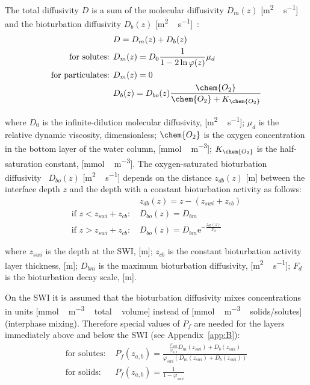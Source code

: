 \documentclass[gmd, manuscript]{copernicus}
\begin{document}
The total diffusivity $D$ is a sum of the molecular diffusivity $D_{m}(z)$ [\unit{m^{2}\,s^{-1}}] and the bioturbation diffusivity $D_{b}(z)$ [\unit{m^{2}\,s^{-1}}]~\citep{Boudreau1997}:
\begin{align}
                            &D = D_{m}(z) + D_{b}(z) \\
    \text{for solutes: }    &D_{m}(z) = D_{0} \frac{1}{1 - 2 \ln \varphi(z)} \mu_{d} \\
    \text{for particulates: }     &D_{m}(z) = 0 \\
                            &D_{b}(z) = D_{bo}(z)
    \frac{\chem{O_{2}}}{\chem{O_{2}} + K_{\chem{O_{2}}}}
\end{align}

where $D_{0}$ is the infinite-dilution molecular diffusivity, [\unit{m^{2}\,s^{-1}}];
$\mu_{d}$ is the relative dynamic viscosity, dimensionless;
$\chem{O_{2}}$ is the oxygen concentration in the bottom layer of the water column, [\unit{mmol\,m^{-3}}];
$K_{\chem{O_{2}}}$ is the half-saturation constant, [\unit{mmol\,m^{-3}}].
The oxygen-saturated bioturbation diffusivity~\citep{Yakushev2017} $D_{bo}(z)$ [\unit{m^{2}\,s^{-1}}] depends on the distance $z_{db}(z)$ [\unit{m}] between the interface depth $z$ and the depth with a constant bioturbation activity as follows:
\begin{align}
    &z_{db}(z) = z - (z_{swi} + z_{cb}) \\
    \text{if $z < z_{swi} + z_{cb}$: } &D_{bo}(z) = D_{bm} \\
    \text{if $z > z_{swi} + z_{cb}$: } &D_{bo}(z) = D_{bm}
    \mathrm{e}^{- \frac{z_{db}(z)}{F_{d}}}
\end{align}

where $z_{swi}$ is the depth at the \textrm{SWI}, [\unit{m}];
$z_{cb}$ is the constant bioturbation activity layer thickness, [\unit{m}];
$D_{bm}$ is the maximum bioturbation diffusivity, [\unit{m^{2}\,s^{-1}}];
$F_{d}$ is the bioturbation decay scale, [\unit{m}].

On the \textrm{SWI} it is assumed that the bioturbation diffusivity mixes concentrations in units [\unit{mmol\,m^{-3}\,total\,volume}] instead of [\unit{mmol\,m^{-3}\,solids/solutes}] (interphase mixing).
Therefore special values of $P_{f}$ are needed for the layers immediately above and below the \textrm{SWI} (see Appendix~\ref{app:B}):
\begin{align}
    \text{for solutes: } &P_{f}(z_{a,b}) =
    \frac{\frac{\varphi_{swi}}{\varphi_{a,b}} D_{m}(z_{swi}) + D_{b}(z_{swi})}
    {\varphi_{swi} ( D_{m}(z_{swi}) + D_{b}(z_{swi}) )} \\
    \text{for solids: } &P_{f}(z_{a,b}) = \frac{1}{1 - \varphi_{swi}}
\end{align}
\end{document}
